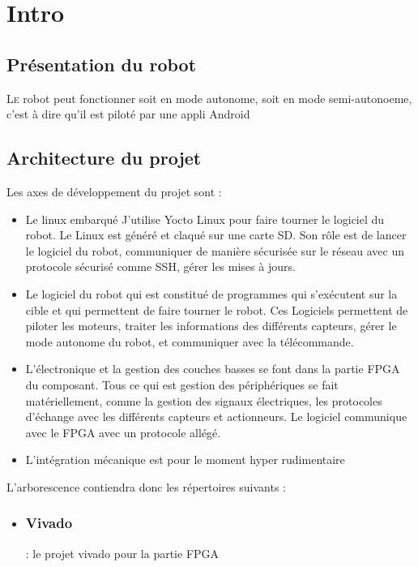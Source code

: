 
\chapter{Intro}

\section{Présentation du robot}
\lettrine[lines=1]{L}e robot peut fonctionner soit en mode autonome, soit en mode semi-autonoeme, c'est à dire qu'il est piloté par une appli Android




\section{Architecture du projet}

Les axes de développement du projet sont : 
\begin{itemize}
\item  Le linux embarqué
J'utilise Yocto Linux pour faire tourner le logiciel du robot. Le Linux est généré et claqué sur une carte SD.
Son rôle est de lancer le logiciel du robot, communiquer de manière sécurisée sur le réseau avec un protocole sécurisé comme SSH, gérer les mises à jours.

\item Le logiciel du robot qui est constitué de programmes qui s'exécutent sur la cible et qui permettent de faire tourner le robot.
Ces Logiciels permettent de piloter les moteurs, traiter les informations des différents capteurs, gérer le mode autonome du robot, et communiquer avec la télécommande.
\item L'électronique et la gestion des couches basses se font dans la partie FPGA du composant.
Tous ce qui est gestion des périphériques se fait matériellement, comme la gestion des signaux électriques, les protocoles d'échange avec les différents capteurs et actionneurs.
Le logiciel communique avec le FPGA avec un protocole allégé.

\item L'intégration mécanique est pour le moment hyper rudimentaire

\end{itemize}




L'arborescence contiendra donc les répertoires suivants : 




\begin{itemize}


\item 


\subsection{Vivado}
  : le projet vivado pour la partie FPGA

\end{itemize}



 
